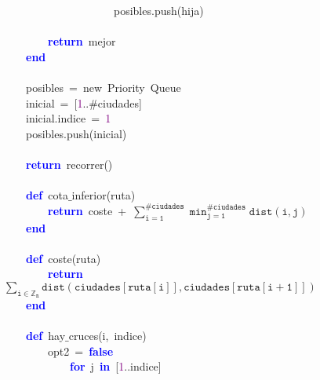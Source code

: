 \mbox{}\ \ \ \ \ \ \ \ \ \ \ \ \ \ \ \ \ \ \ \ posibles\textcolor{BrickRed}{.}push\textcolor{BrickRed}{(}hija\textcolor{BrickRed}{)} \\
\mbox{} \\
\mbox{}\ \ \ \ \ \ \ \ \textbf{\textcolor{Blue}{return}}\ mejor \\
\mbox{}\ \ \ \ \textbf{\textcolor{Blue}{end}} \\
\mbox{} \\
\mbox{}\ \ \ \ posibles\ \textcolor{BrickRed}{=}\ new\ Priority\ Queue \\
\mbox{}\ \ \ \ inicial\ \textcolor{BrickRed}{=}\ \textcolor{BrickRed}{[}\textcolor{Purple}{1}\textcolor{BrickRed}{..}\#ciudades\textcolor{BrickRed}{]} \\
\mbox{}\ \ \ \ inicial\textcolor{BrickRed}{.}indice\ \textcolor{BrickRed}{=}\ \textcolor{Purple}{1} \\
\mbox{}\ \ \ \ posibles\textcolor{BrickRed}{.}push\textcolor{BrickRed}{(}inicial\textcolor{BrickRed}{)} \\
\mbox{}\ \ \ \  \\
\mbox{}\ \ \ \ \textbf{\textcolor{Blue}{return}}\ recorrer\textcolor{BrickRed}{()} \\
\mbox{} \\
\mbox{}\ \ \ \ \textbf{\textcolor{Blue}{def}}\ cota$\_$inferior\textcolor{BrickRed}{(}ruta\textcolor{BrickRed}{)} \\
\mbox{}\ \ \ \ \ \ \ \ \textbf{\textcolor{Blue}{return}}\ coste\ \textcolor{BrickRed}{+}\ $\mathtt{\sum_{i=1}^{\#ciudades} \min_{j=1}^{\#ciudades} dist(i,j)}$ \\
\mbox{}\ \ \ \ \textbf{\textcolor{Blue}{end}} \\
\mbox{} \\
\mbox{}\ \ \ \ \textbf{\textcolor{Blue}{def}}\ coste\textcolor{BrickRed}{(}ruta\textcolor{BrickRed}{)} \\
\mbox{}\ \ \ \ \ \ \ \ \textbf{\textcolor{Blue}{return}}\ $\mathtt{\sum_{i \in \mathbb{Z}_n} dist(ciudades[ruta[i]], ciudades[ruta[i+1]])}$ \\
\mbox{}\ \ \ \ \textbf{\textcolor{Blue}{end}} \\
\mbox{} \\
\mbox{}\ \ \ \ \textbf{\textcolor{Blue}{def}}\ hay$\_$cruces\textcolor{BrickRed}{(}i\textcolor{BrickRed}{,}\ indice\textcolor{BrickRed}{)} \\
\mbox{}\ \ \ \ \ \ \ \ opt2\ \textcolor{BrickRed}{=}\ \textbf{\textcolor{Blue}{false}} \\
\mbox{}\ \ \ \ \ \ \ \ \ \ \ \ \textbf{\textcolor{Blue}{for}}\ j\ \textbf{\textcolor{Blue}{in}}\ \textcolor{BrickRed}{[}\textcolor{Purple}{1}\textcolor{BrickRed}{..}indice\textcolor{BrickRed}{]} \\
